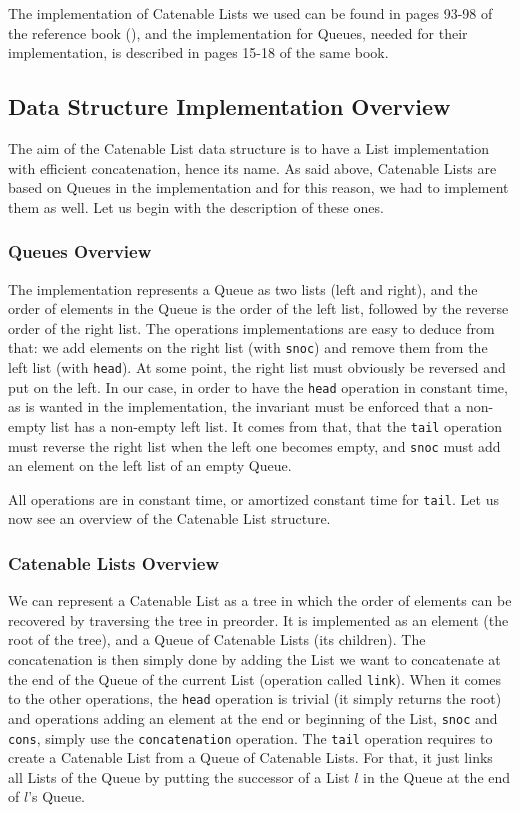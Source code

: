 The implementation of Catenable Lists we used can be found 
in pages 93-98 of the reference book (\cite{Okasaki}),
and the implementation for Queues, needed for their implementation, 
is described in pages 15-18 of the same book.

\subsection{Data Structure Implementation Overview}
The aim of the Catenable List data structure is 
to have a List implementation with efficient concatenation, 
hence its name.
As said above, Catenable Lists are based on Queues in the implementation
and for this reason, we had to implement them as well.
Let us begin with the description of these ones.

\subsubsection{Queues Overview}
The implementation represents a Queue as two lists (left and right), 
and the order of elements in the Queue is the order of the left list, 
followed by the reverse order of the right list.
The operations implementations are easy to deduce from that: 
we add elements on the right list (with \verb|snoc|) 
and remove them from the left list (with \verb|head|).
At some point, the right list must obviously be reversed and put on the left.
In our case, in order to have the \verb|head|
operation in constant time,
as is wanted in the implementation,
the invariant must be enforced that a non-empty list has a non-empty left list.
It comes from that, 
that the \verb|tail| operation must reverse the right list when the left one becomes empty, 
and \verb|snoc| must add an element on the left list of an empty Queue.

All operations are in constant time, or amortized constant time for \verb|tail|.
Let us now see an overview of the Catenable List structure.

\subsubsection{Catenable Lists Overview}
We can represent a Catenable List as a tree 
in which the order of elements can be recovered by traversing the tree in preorder.
It is implemented as an element (the root of the tree), 
and a Queue of Catenable Lists (its children).
The concatenation is then simply done by adding the List we want to concatenate 
at the end of the Queue of the current List 
(operation called \verb|link|).
When it comes to the other operations,
the \verb|head| operation is trivial (it simply returns the root)
and operations adding an element at the end or beginning of the List, 
\verb|snoc| and \verb|cons|,
simply use the \verb|concatenation| operation.
The \verb|tail| operation requires 
to create a Catenable List from a Queue of Catenable Lists.
For that, it just links all Lists of the Queue 
by putting the successor of a List $l$ in the Queue at the end of $l$'s Queue.

